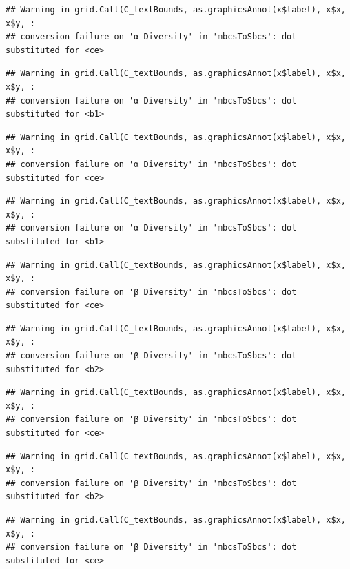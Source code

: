 \documentclass[
]{article}
\begin{document}
\begin{verbatim}
## Warning in grid.Call(C_textBounds, as.graphicsAnnot(x$label), x$x, x$y, :
## conversion failure on 'α Diversity' in 'mbcsToSbcs': dot substituted for <ce>
\end{verbatim}

\begin{verbatim}
## Warning in grid.Call(C_textBounds, as.graphicsAnnot(x$label), x$x, x$y, :
## conversion failure on 'α Diversity' in 'mbcsToSbcs': dot substituted for <b1>
\end{verbatim}

\begin{verbatim}
## Warning in grid.Call(C_textBounds, as.graphicsAnnot(x$label), x$x, x$y, :
## conversion failure on 'α Diversity' in 'mbcsToSbcs': dot substituted for <ce>
\end{verbatim}

\begin{verbatim}
## Warning in grid.Call(C_textBounds, as.graphicsAnnot(x$label), x$x, x$y, :
## conversion failure on 'α Diversity' in 'mbcsToSbcs': dot substituted for <b1>
\end{verbatim}

\begin{verbatim}
## Warning in grid.Call(C_textBounds, as.graphicsAnnot(x$label), x$x, x$y, :
## conversion failure on 'β Diversity' in 'mbcsToSbcs': dot substituted for <ce>
\end{verbatim}

\begin{verbatim}
## Warning in grid.Call(C_textBounds, as.graphicsAnnot(x$label), x$x, x$y, :
## conversion failure on 'β Diversity' in 'mbcsToSbcs': dot substituted for <b2>
\end{verbatim}

\begin{verbatim}
## Warning in grid.Call(C_textBounds, as.graphicsAnnot(x$label), x$x, x$y, :
## conversion failure on 'β Diversity' in 'mbcsToSbcs': dot substituted for <ce>
\end{verbatim}

\begin{verbatim}
## Warning in grid.Call(C_textBounds, as.graphicsAnnot(x$label), x$x, x$y, :
## conversion failure on 'β Diversity' in 'mbcsToSbcs': dot substituted for <b2>
\end{verbatim}

\begin{verbatim}
## Warning in grid.Call(C_textBounds, as.graphicsAnnot(x$label), x$x, x$y, :
## conversion failure on 'β Diversity' in 'mbcsToSbcs': dot substituted for <ce>
\end{verbatim}
\end{document}
